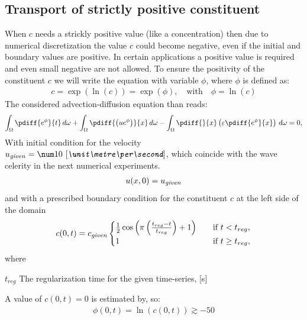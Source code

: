 \subsection{Transport of strictly positive constituent}
When $c$ needs a strickly positive value (like a concentration) then due to numerical discretization the value $c$ could become negative, even if the initial and boundary values are positive.
In certain applications a positive value is required and even small negative are not allowed.
To ensure the positivity of the constituent $c$ we will write the equation with variable $\phi$, where $\phi$ is defined as:
\begin{align}
    c = \exp(\ln(c)) =  \exp(\phi), \quad \text{with} \quad \phi = \ln(c)
\end{align}
The considered advection-diffusion equation than reads:
\begin{align}
    \int_\Omega\pdiff{{e^\phi}}{t} \, d\omega
    + \int_\Omega\pdiff{\left(u{e^\phi}\right)}{x} \, d\omega
    - \int_\Omega\pdiff{}{x}\left(\eps \pdiff{{e^\phi}}{x}\right)\, d\omega = 0,\label{eq:1d_advec_phi}
\end{align}
With initial condition for the velocity $u_{\it given} = \bqty{10}{\metre\per\second}$, which coincide with the wave celerity in the next numerical experiments.
\begin{align}
    u(x,0) = u_{\it given}
\end{align}
and with a prescribed boundary condition for the constituent $c$ at the left side of the domain
\begin{align}
    c(0,t) = c_{\it given}
    \begin{cases}
        \frac{1}{2} \cos\left(\pi \left(\frac{t_{reg} - t}{t_{reg}}\right)+ 1\right) &\quad \text{if } t < t_{reg},
        \\
        1 &\quad \text{if } t \geq t_{reg},
    \end{cases}
\end{align}
where
\begin{symbollist}
    \item[$t_{reg}$] The regularization time for the given time-series, [\si{\second}]
\end{symbollist}
A value of $c(0,t)=0$ is estimated by, so:
\begin{align}
    \phi(0,t) = \ln(c(0,t)) \gtrsim -50
\end{align}
